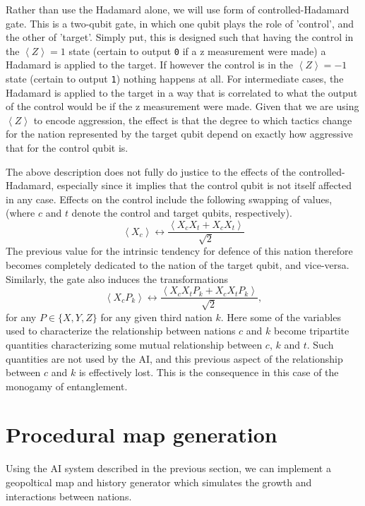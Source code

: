 \documentclass[conference]{IEEEtran}
\begin{document}
Rather than use the Hadamard alone, we will use form of controlled-Hadamard gate. This is a two-qubit gate, in which one qubit plays the role of 'control', and the other of 'target'. Simply put, this is designed such that having the control in the $\left\langle Z\right\rangle=1$ state (certain to output \texttt{0} if a z measurement were made) a Hadamard is applied to the target. If however the control is in the $\left\langle Z\right\rangle=-1$ state (certain to output \texttt{1}) nothing happens at all. For intermediate cases, the Hadamard is applied to the target in a way that is correlated to what the output of the control would be if the z measurement were made. Given that  we are using $\left\langle Z\right\rangle$ to encode aggression, the effect is that the degree to which tactics change for the nation represented by the target qubit depend on exactly how aggressive that for the control qubit is.

The above description does not fully do justice to the effects of the controlled-Hadamard, especially since it implies that the control qubit is not itself affected in any case. Effects on the control include the following swapping of values, (where $c$ and $t$ denote the control and target qubits, respectively).
$$
\left\langle X_c \right\rangle \leftrightarrow \frac{ \left\langle X_c X_t + X_c X_t \right\rangle }{ \sqrt{2} }
$$
The previous value for the intrinsic tendency for defence of this nation therefore becomes completely dedicated to the nation of the target qubit, and vice-versa. Similarly, the gate also induces the transformations
$$
\left\langle X_c P_k \right\rangle \leftrightarrow \frac{ \left\langle X_c X_t P_k + X_c X_t P_k \right\rangle }{ \sqrt{2} },
$$
for any $P  \in \{X,Y,Z\}$ for any given third nation $k$. Here some of the variables used to characterize the relationship between nations $c$ and $k$ become tripartite quantities characterizing some mutual relationship between $c$, $k$ and $t$. Such quantities are not used by the AI, and this previous aspect of the relationship between $c$ and $k$ is effectively lost. This is the consequence in this case of the monogamy of entanglement.


\section{Procedural map generation}

Using the AI system described in the previous section, we can implement a geopoltical map and history generator which simulates the growth and interactions between nations.
\end{document}
